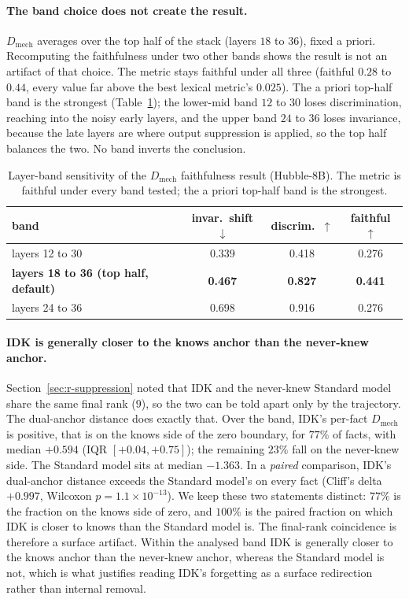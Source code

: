 \paragraph{The band choice does not create the result.}
$D_\text{mech}$ averages over the top half of the stack (layers $18$ to $36$), fixed a priori. Recomputing the
faithfulness under two other bands shows the result is not an artifact of that choice. The metric stays
faithful under all three (faithful $0.28$ to $0.44$, every value far above the best lexical metric's $0.025$).
The a priori top-half band is the strongest (Table~\ref{tab:band}); the lower-mid band $12$ to $30$
loses discrimination, reaching into the noisy early layers, and the upper band $24$ to $36$ loses invariance,
because the late layers are where output suppression is applied, so the top half balances the two. No band
inverts the conclusion.

\begin{table}[t]
  \centering
  \caption[Layer-band sensitivity of $D_\text{mech}$]{Layer-band sensitivity of the $D_\text{mech}$ faithfulness result (Hubble-8B). The metric is
  faithful under every band tested; the a priori top-half band is the strongest.}
  \label{tab:band}
  \begin{tabular}{lccc}
    \toprule
    band & invar.\ shift $\downarrow$ & discrim.\ $\uparrow$ & faithful $\uparrow$ \\
    \midrule
    layers 12 to 30              & 0.339 & 0.418 & 0.276 \\
    \textbf{layers 18 to 36 (top half, default)} & \textbf{0.467} & \textbf{0.827} & \textbf{0.441} \\
    layers 24 to 36              & 0.698 & 0.916 & 0.276 \\
    \bottomrule
  \end{tabular}
\end{table}

\paragraph{IDK is generally closer to the knows anchor than the never-knew anchor.}
Section~\ref{sec:r-suppression} noted that IDK and the never-knew Standard model share the same final rank
($9$), so the two can be told apart only by the trajectory. The dual-anchor distance does exactly that.
Over the band, IDK's per-fact $D_\text{mech}$ is positive, that is on the knows side of the zero boundary,
for $77\%$ of facts, with median $+0.594$ (IQR $[+0.04, +0.75]$); the remaining $23\%$ fall on the
never-knew side. The Standard model sits at median $-1.363$. In a \emph{paired} comparison, IDK's dual-anchor
distance exceeds the Standard model's on every fact (Cliff's delta $+0.997$, Wilcoxon
$p = 1.1\times10^{-13}$). We keep these two statements distinct: $77\%$ is the fraction on the knows side of
zero, and $100\%$ is the paired fraction on which IDK is closer to knows than the Standard model is. The
final-rank coincidence is therefore a surface artifact. Within the analysed band IDK is generally closer to
the knows anchor than the never-knew anchor, whereas the Standard model is not, which is what justifies
reading IDK's forgetting as a surface redirection rather than internal removal.

